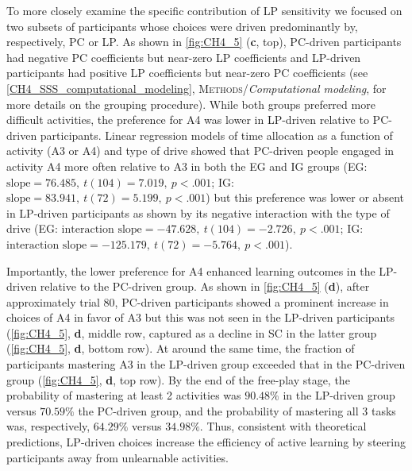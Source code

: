 To more closely examine the specific contribution of \ac{LP} sensitivity we focused on two subsets of participants whose choices were driven predominantly by, respectively, \ac{PC} or \ac{LP}. As shown in \cref{fig:CH4_5} (\textbf{c}, top), \ac{PC}-driven participants had negative \ac{PC} coefficients but near-zero \ac{LP} coefficients and \ac{LP}-driven participants had positive \ac{LP} coefficients but near-zero \ac{PC} coefficients (see \cref{CH4_SSS_computational_modeling}, \textsc{Methods}/\textit{Computational modeling}, for more details on the grouping procedure). While both groups preferred more difficult activities, the preference for A4 was lower in \ac{LP}-driven relative to \ac{PC}-driven participants. Linear regression models of time allocation as a function of activity (A3 or A4) and type of drive showed that \ac{PC}-driven people engaged in activity A4 more often relative to A3 in both the \ac{EG} and \ac{IG} groups (\ac{EG}: $\text{slope} = 76.485,\ t(104) = 7.019,\ p < .001$; \ac{IG}: $\text{slope} = 83.941,\ t(72) = 5.199,\ p < .001$) but this preference was lower or absent in \ac{LP}-driven participants as shown by its negative interaction with the type of drive (\ac{EG}: $\text{interaction slope} = -47.628,\ t(104) = -2.726,\ p < .001$; \ac{IG}: $\text{interaction slope} = -125.179,\ t(72) = -5.764,\ p < .001$).

Importantly, the lower preference for A4 enhanced learning outcomes in the \ac{LP}-driven relative to the \ac{PC}-driven group. As shown in \cref{fig:CH4_5} (\textbf{d}), after approximately trial 80, \ac{PC}-driven participants showed a prominent increase in choices of A4 in favor of A3 but this was not seen in the \ac{LP}-driven participants (\cref{fig:CH4_5}, \textbf{d}, middle row, captured as a decline in \ac{SC} in the latter group (\cref{fig:CH4_5}, \textbf{d}, bottom row). At around the same time, the fraction of participants mastering A3 in the \ac{LP}-driven group exceeded that in the \ac{PC}-driven group (\cref{fig:CH4_5}, \textbf{d}, top row). By the end of the free-play stage, the probability of mastering at least 2 activities was $90.48\%$ in the \ac{LP}-driven group versus $70.59\%$ the \ac{PC}-driven group, and the  probability of mastering all 3 tasks was, respectively, $64.29\%$ versus $34.98\%$. Thus, consistent with theoretical predictions, \ac{LP}-driven choices increase the efficiency of active learning by steering participants away from unlearnable activities.

